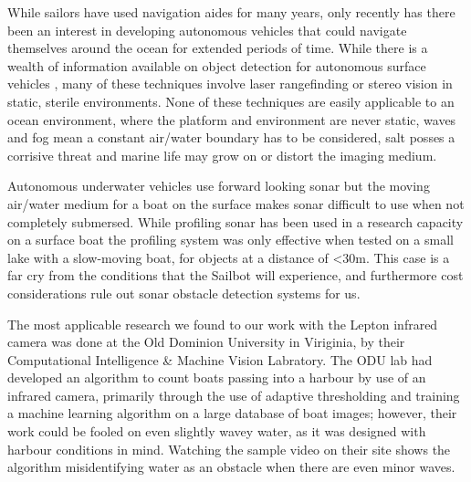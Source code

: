 While sailors have used navigation aides for many years, only recently has there been an interest in developing autonomous vehicles that could navigate themselves around the ocean for extended periods of time. While there is a wealth of information available on object detection for autonomous surface vehicles \cite{detection-offroad} \cite{optical-flow-detection} \cite{unmanned-ground-vehicles}, many of these techniques involve laser rangefinding or stereo vision in static, sterile environments. None of these techniques are easily applicable to an ocean environment, where the platform and environment are never static, waves and fog mean a constant air/water boundary has to be considered, salt posses a corrisive threat and marine life may grow on or distort the imaging medium. 

Autonomous underwater vehicles use forward looking sonar but the moving air/water medium for a boat on the surface makes sonar difficult to use when not completely submersed. While profiling sonar has been used in a research capacity on a surface boat\cite{ASV-sonar} the profiling system was only effective when tested on a small lake with a slow-moving boat, for objects at a distance of <30m. This case is a far cry from the conditions that the Sailbot will experience, and furthermore cost considerations rule out sonar obstacle detection systems for us.

The most applicable research we found to our work with the Lepton infrared camera was done at the Old Dominion University in Viriginia, by their Computational Intelligence & Machine Vision Labratory. The ODU lab had developed an algorithm to count boats passing into a harbour by use of an infrared camera, primarily through the use of adaptive thresholding and training a machine learning algorithm on a large database of boat images; however, their work could be fooled on even slightly wavey water, as it was designed with harbour conditions in mind. Watching the sample video on their site shows the algorithm misidentifying water as an obstacle when there are even minor waves.\cite{ODU-boat-IR-detection}

